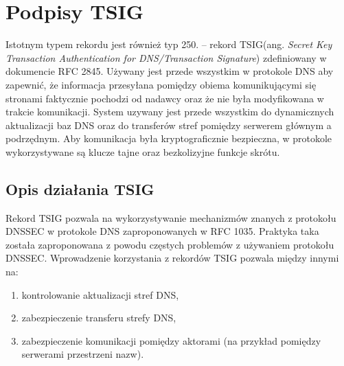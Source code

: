 \section{Podpisy TSIG}
\label{TSIG}
Istotnym typem rekordu jest również typ 250. -- rekord TSIG(ang. \textit{Secret Key Transaction Authentication for DNS/Transaction Signature}) zdefiniowany w dokumencie RFC 2845\cite{RFC2845}. Używany jest przede wszystkim w protokole DNS aby zapewnić, że informacja przesyłana pomiędzy obiema komunikującymi się stronami faktycznie pochodzi od nadawcy oraz że nie była modyfikowana w trakcie komunikacji. System uzywany jest przede wszystkim do dynamicznych aktualizacji baz DNS oraz do transferów stref pomiędzy serwerem głównym a podrzędnym. Aby komunikacja była kryptograficznie bezpieczna, w protokole wykorzystywane są klucze tajne oraz bezkolizyjne funkcje skrótu.

\subsection{Opis działania TSIG}
Rekord TSIG pozwala na wykorzystywanie mechanizmów znanych z protokołu DNSSEC\cite{nask-tsig} w protokole DNS zaproponowanych w RFC 1035\cite{RFC1035}. Praktyka taka została zaproponowana z powodu częstych problemów z używaniem protokołu DNSSEC\cite{RFC4033, RFC4035}. Wprowadzenie korzystania z rekordów TSIG pozwala między innymi na:
\begin{enumerate}
	\item kontrolowanie aktualizacji stref DNS,
	\item zabezpieczenie transferu strefy DNS,
	\item zabezpieczenie komunikacji pomiędzy aktorami (na przykład pomiędzy serwerami przestrzeni nazw).
\end{enumerate}

